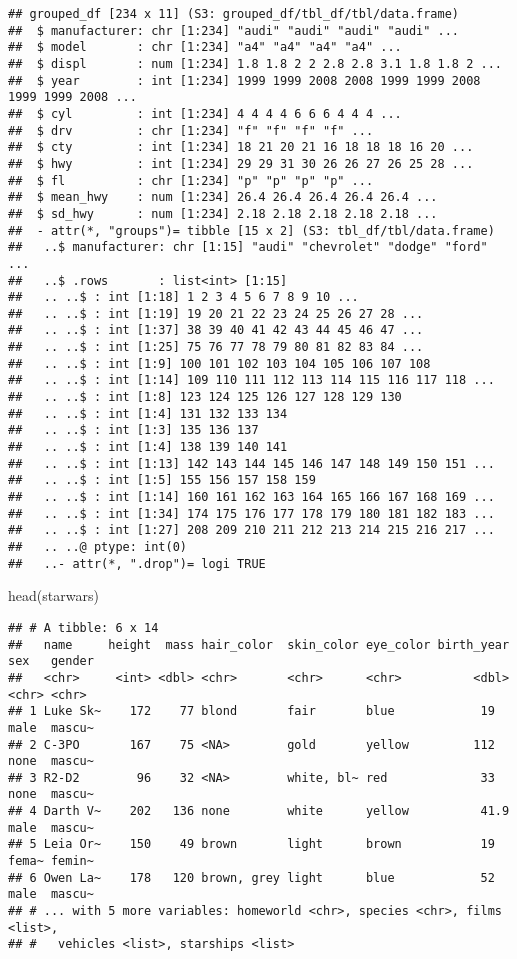 \documentclass[
]{article}
\newenvironment{Shaded}{\begin{snugshade}}{\end{snugshade}}
\newcommand{\FunctionTok}[1]{\textcolor[rgb]{0.00,0.00,0.00}{#1}}
\newcommand{\NormalTok}[1]{#1}
\begin{document}
\begin{verbatim}
## grouped_df [234 x 11] (S3: grouped_df/tbl_df/tbl/data.frame)
##  $ manufacturer: chr [1:234] "audi" "audi" "audi" "audi" ...
##  $ model       : chr [1:234] "a4" "a4" "a4" "a4" ...
##  $ displ       : num [1:234] 1.8 1.8 2 2 2.8 2.8 3.1 1.8 1.8 2 ...
##  $ year        : int [1:234] 1999 1999 2008 2008 1999 1999 2008 1999 1999 2008 ...
##  $ cyl         : int [1:234] 4 4 4 4 6 6 6 4 4 4 ...
##  $ drv         : chr [1:234] "f" "f" "f" "f" ...
##  $ cty         : int [1:234] 18 21 20 21 16 18 18 18 16 20 ...
##  $ hwy         : int [1:234] 29 29 31 30 26 26 27 26 25 28 ...
##  $ fl          : chr [1:234] "p" "p" "p" "p" ...
##  $ mean_hwy    : num [1:234] 26.4 26.4 26.4 26.4 26.4 ...
##  $ sd_hwy      : num [1:234] 2.18 2.18 2.18 2.18 2.18 ...
##  - attr(*, "groups")= tibble [15 x 2] (S3: tbl_df/tbl/data.frame)
##   ..$ manufacturer: chr [1:15] "audi" "chevrolet" "dodge" "ford" ...
##   ..$ .rows       : list<int> [1:15] 
##   .. ..$ : int [1:18] 1 2 3 4 5 6 7 8 9 10 ...
##   .. ..$ : int [1:19] 19 20 21 22 23 24 25 26 27 28 ...
##   .. ..$ : int [1:37] 38 39 40 41 42 43 44 45 46 47 ...
##   .. ..$ : int [1:25] 75 76 77 78 79 80 81 82 83 84 ...
##   .. ..$ : int [1:9] 100 101 102 103 104 105 106 107 108
##   .. ..$ : int [1:14] 109 110 111 112 113 114 115 116 117 118 ...
##   .. ..$ : int [1:8] 123 124 125 126 127 128 129 130
##   .. ..$ : int [1:4] 131 132 133 134
##   .. ..$ : int [1:3] 135 136 137
##   .. ..$ : int [1:4] 138 139 140 141
##   .. ..$ : int [1:13] 142 143 144 145 146 147 148 149 150 151 ...
##   .. ..$ : int [1:5] 155 156 157 158 159
##   .. ..$ : int [1:14] 160 161 162 163 164 165 166 167 168 169 ...
##   .. ..$ : int [1:34] 174 175 176 177 178 179 180 181 182 183 ...
##   .. ..$ : int [1:27] 208 209 210 211 212 213 214 215 216 217 ...
##   .. ..@ ptype: int(0) 
##   ..- attr(*, ".drop")= logi TRUE
\end{verbatim}

\begin{Shaded}
\begin{Highlighting}[]
\FunctionTok{head}\NormalTok{(starwars)}
\end{Highlighting}
\end{Shaded}

\begin{verbatim}
## # A tibble: 6 x 14
##   name     height  mass hair_color  skin_color eye_color birth_year sex   gender
##   <chr>     <int> <dbl> <chr>       <chr>      <chr>          <dbl> <chr> <chr> 
## 1 Luke Sk~    172    77 blond       fair       blue            19   male  mascu~
## 2 C-3PO       167    75 <NA>        gold       yellow         112   none  mascu~
## 3 R2-D2        96    32 <NA>        white, bl~ red             33   none  mascu~
## 4 Darth V~    202   136 none        white      yellow          41.9 male  mascu~
## 5 Leia Or~    150    49 brown       light      brown           19   fema~ femin~
## 6 Owen La~    178   120 brown, grey light      blue            52   male  mascu~
## # ... with 5 more variables: homeworld <chr>, species <chr>, films <list>,
## #   vehicles <list>, starships <list>
\end{verbatim}
\end{document}
